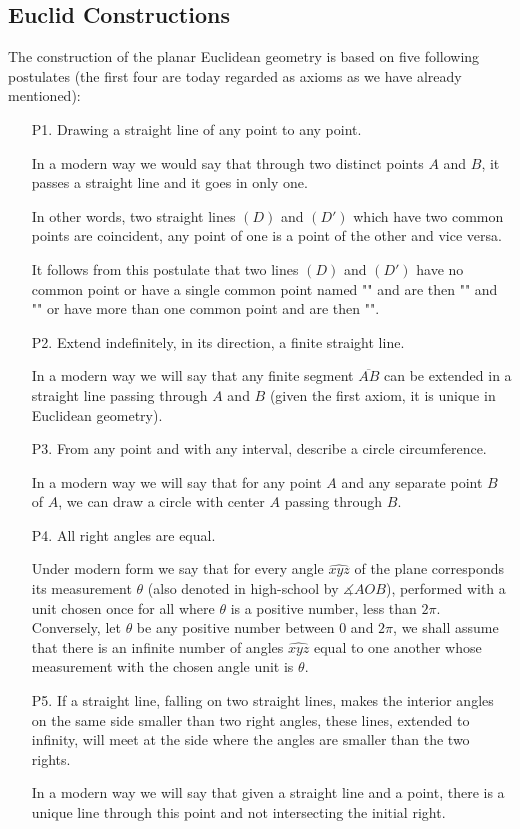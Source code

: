 	\subsection{Euclid Constructions}
	The construction of the planar Euclidean geometry is based on five following postulates (the first four are today regarded as axioms as we have already mentioned):
	\begin{enumerate}
		\item[P1.] Drawing a straight line of any point to any point.
		
		In a modern way we would say that through two distinct points $A$ and $B$, it passes a straight line and it goes in only one.
		
		In other words, two straight lines $(D)$ and $(D ')$ which have two common points are coincident, any point of one is a point of the other and vice versa.
		
		It follows from this postulate that two lines $(D)$ and $(D ')$ have no common point or have a single common point named "" and are then "" and "" or have more than one common point and are then "".
		
		\item[P2.] Extend indefinitely, in its direction, a finite straight line.
		
		In a modern way we will say that any finite segment $\overline{AB}$ can be extended in a straight line passing through $A$ and $B$ (given the first axiom, it is unique in Euclidean geometry).
		
		\item[P3.] From any point and with any interval, describe a circle circumference.
		
		In a modern way we will say that for any point $A$ and any separate point $B$ of $A$, we can draw a circle with center $A$ passing through $B$.
		
		\item[P4.] All right angles are equal.
		
		Under modern form we say that for every angle $\widehat{xyz}$ of the plane corresponds its  measurement $\theta$ (also denoted in high-school by $\measuredangle AOB$), performed with a unit chosen once for all where $\theta$ is a positive number, less than $2\pi$. Conversely, let $\theta$ be any positive number between $0$ and $2\pi$, we shall assume that there is an infinite number of angles $\widehat{xyz}$ equal to one another whose measurement with the chosen angle unit is $\theta$.
		
		 \item[P5.] If a straight line, falling on two straight lines, makes the interior angles on the same side smaller than two right angles, these lines, extended to infinity, will meet at the side where the angles are smaller than the two rights.
		 
		 In a modern way we will say that given a straight line and a point, there is a unique line through this point and not intersecting the initial right.		
	\end{enumerate}


